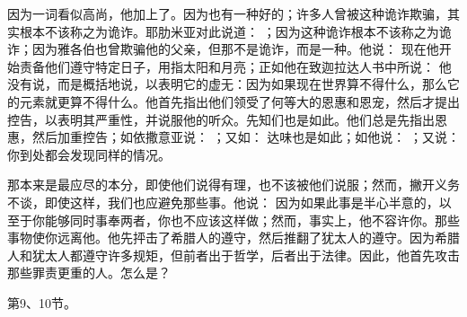 因为一词看似高尚，他加上了。因为也有一种好的；许多人曾被这种诡诈欺骗，其实根本不该称之为诡诈。耶肋米亚对此说道： ；因为这种诡诈根本不该称之为诡诈；因为雅各伯也曾欺骗他的父亲，但那不是诡诈，而是一种。他说： 现在他开始责备他们遵守特定日子，用指太阳和月亮；正如他在致迦拉达人书中所说：  他没有说，而是概括地说，以表明它的虚无：因为如果现在世界算不得什么，那么它的元素就更算不得什么。他首先指出他们领受了何等大的恩惠和恩宠，然后才提出控告，以表明其严重性，并说服他的听众。先知们也是如此。他们总是先指出恩惠，然后加重控告；如依撒意亚说： ；又如：  达味也是如此；如他说： ；又说：  你到处都会发现同样的情况。\par

那本来是最应尽的本分，即使他们说得有理，也不该被他们说服；然而，撇开义务不谈，即使这样，我们也应避免那些事。他说： 因为如果此事是半心半意的，以至于你能够同时事奉两者，你也不应该这样做；然而，事实上，他不容许你。那些事物使你远离他。他先抨击了希腊人的遵守，然后推翻了犹太人的遵守。因为希腊人和犹太人都遵守许多规矩，但前者出于哲学，后者出于法律。因此，他首先攻击那些罪责更重的人。怎么是？\par

第9、10节。 \par

